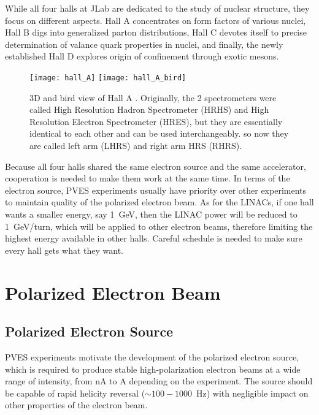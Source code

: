 While all four halls at JLab are dedicated to the study of nuclear structure, they
focus on different aspects. Hall A concentrates on form factors of various nuclei, 
Hall B digs into generalized parton distributions, Hall C devotes itself to precise
determination of valance quark properties in nuclei, and finally, the newly 
established Hall D explores origin of confinement through exotic mesons.
\begin{figure}[!h]
    \centering
    \texttt{[image: hall\_A]}
    \texttt{[image: hall\_A\_bird]}
    \caption[Hall A]
    {3D and bird view of Hall A \cite{halla_manual}. Originally, the 2 spectrometers
    were called High Resolution Hadron Spectrometer (HRHS) and High Resolution Electron
    Spectrometer (HRES), but they are essentially identical to each other and
    can be used interchangeably.
    so now they are called left arm (LHRS) and right arm HRS (RHRS).
    }
\end{figure}

Because all four halls shared the same electron source and the same accelerator, 
cooperation is needed to make them work at the same time. In terms of the electron
source, PVES experiments usually have priority over other experiments to maintain 
quality of the polarized electron beam. As for the LINACs, if one hall wants
a smaller energy, say 1~GeV, then the LINAC power will be reduced to 1~GeV/turn,
which will be applied to other electron beams, therefore limiting the 
highest energy available in other halls. Careful schedule is needed to make sure
every hall gets what they want.
\section{Polarized Electron Beam}

\subsection{Polarized Electron Source}
PVES experiments motivate the development of the polarized electron source, which 
is required to produce stable high-polarization electron beams at a wide range of intensity, 
from nA to A depending on the experiment. The source should be capable of rapid helicity
reversal ($\sim 100-1000$~Hz) with negligible impact on other properties of the electron beam.

